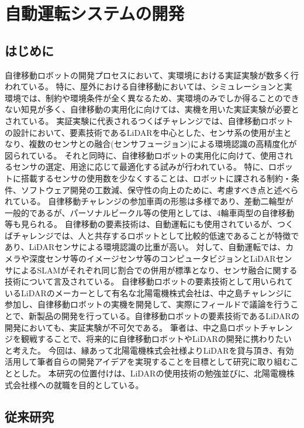 \chapter{自動運転システムの開発}
\section{はじめに}

自律移動ロボットの開発プロセスにおいて、実環境における実証実験が数多く行われている。
特に、屋外における自律移動においては、シミュレーションと実環境では、制約や環境条件が全く異なるため、実環境のみでしか得ることのできない知見が多く、自律移動の実用化に向けては、実機を用いた実証実験が必要とされている。
実証実験に代表されるつくばチャレンジでは、自律移動ロボットの設計において、要素技術であるLiDARを中心とした、センサ系の使用が主となり、複数のセンサとの融合(センサフュージョン)による環境認識の高精度化が図られている。
それと同時に、自律移動ロボットの実用化に向けて、使用されるセンサの選定、用途に応じて最適化する試みが行われている。
特に、ロボットに搭載するセンサの使用数を少なくすることは、ロボットに課される制約・条件、ソフトウェア開発の工数減、保守性の向上のために、考慮すべき点と述べられている。
自律移動チャレンジの参加車両の形態は多様であり、差動二輪型が一般的であるが、パーソナルビークル等の使用としては、4輪車両型の自律移動等も見られる。
自律移動の要素技術は、自動運転にも使用されているが、つくばチャレンジでは、人と共存するロボットとして比較的低速であることが特徴であり、LiDARセンサによる環境認識の比重が高い。
対して、自動運転では、カメラや深度センサ等のイメージセンサ等のコンピュータビジョンとLiDARセンサによるSLAMがそれぞれ同じ割合での併用が標準となり、センサ融合に関する技術について言及されている。
自律移動ロボットの要素技術として用いられているLiDARのメーカーとして有名な北陽電機株式会社は、中之島チャレンジに参加し、自律移動ロボットの実機を開発して、実際にフィールドで議論を行うことで、新製品の開発を行っている。自律移動ロボットの要素技術であるLiDARの開発においても、実証実験が不可欠である。
筆者は、中之島ロボットチャレンジを観戦することで、将来的に自律移動ロボットやLiDARの開発に携わりたいと考えた。
今回は、縁あって北陽電機株式会社様よりLiDARを貸与頂き、有効活用して筆者自らの開発アイデアを実現することを目標として研究に取り組むこととした。
本研究の位置付けは、LiDARの使用技術の勉強並びに、北陽電機株式会社様への就職を目的としている。

\section{従来研究}
